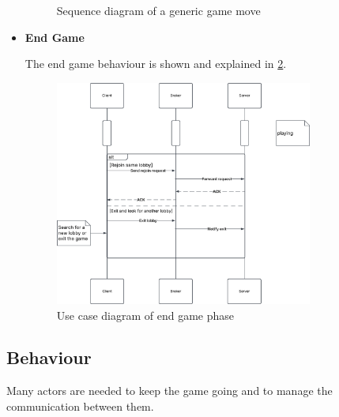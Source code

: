 \documentclass{scrartcl}
\begin{document}
\begin{itemize}
\begin{figure}
                  \caption{Sequence diagram of a generic game move}
                  \label{fig:game-move}
            \end{figure}
      \item \textbf{End Game} \par
            The end game behaviour is shown and explained in \cref{fig:end-game}.
            \begin{figure}
                  \centering
                  \includegraphics[width=0.8\textwidth]{figures/sequenceEndGame.png}
                  \caption{Use case diagram of end game phase}
                  \label{fig:end-game}
            \end{figure}
\end{itemize}

\subsection{Behaviour}\label{behaviour}

Many actors are needed to keep the game going and to manage the communication between them.
\end{document}
